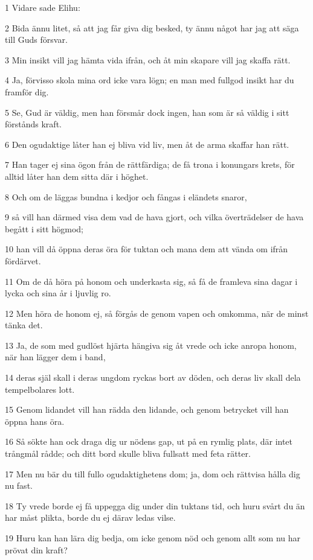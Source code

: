 \par 1 Vidare sade Elihu:
\par 2 Bida ännu litet, så att jag får giva dig besked, ty ännu något har jag att säga till Guds försvar.
\par 3 Min insikt vill jag hämta vida ifrån, och åt min skapare vill jag skaffa rätt.
\par 4 Ja, förvisso skola mina ord icke vara lögn; en man med fullgod insikt har du framför dig.
\par 5 Se, Gud är väldig, men han försmår dock ingen, han som är så väldig i sitt förstånds kraft.
\par 6 Den ogudaktige låter han ej bliva vid liv, men åt de arma skaffar han rätt.
\par 7 Han tager ej sina ögon från de rättfärdiga; de få trona i konungars krets, för alltid låter han dem sitta där i höghet.
\par 8 Och om de läggas bundna i kedjor och fångas i eländets snaror,
\par 9 så vill han därmed visa dem vad de hava gjort, och vilka överträdelser de hava begått i sitt högmod;
\par 10 han vill då öppna deras öra för tuktan och mana dem att vända om ifrån fördärvet.
\par 11 Om de då höra på honom och underkasta sig, så få de framleva sina dagar i lycka och sina år i ljuvlig ro.
\par 12 Men höra de honom ej, så förgås de genom vapen och omkomma, när de minst tänka det.
\par 13 Ja, de som med gudlöst hjärta hängiva sig åt vrede och icke anropa honom, när han lägger dem i band,
\par 14 deras själ skall i deras ungdom ryckas bort av döden, och deras liv skall dela tempelbolares lott.
\par 15 Genom lidandet vill han rädda den lidande, och genom betrycket vill han öppna hans öra.
\par 16 Så sökte han ock draga dig ur nödens gap, ut på en rymlig plats, där intet trångmål rådde; och ditt bord skulle bliva fullsatt med feta rätter.
\par 17 Men nu bär du till fullo ogudaktighetens dom; ja, dom och rättvisa hålla dig nu fast.
\par 18 Ty vrede borde ej få uppegga dig under din tuktans tid, och huru svårt du än har måst plikta, borde du ej därav ledas vilse.
\par 19 Huru kan han lära dig bedja, om icke genom nöd och genom allt som nu har prövat din kraft?

